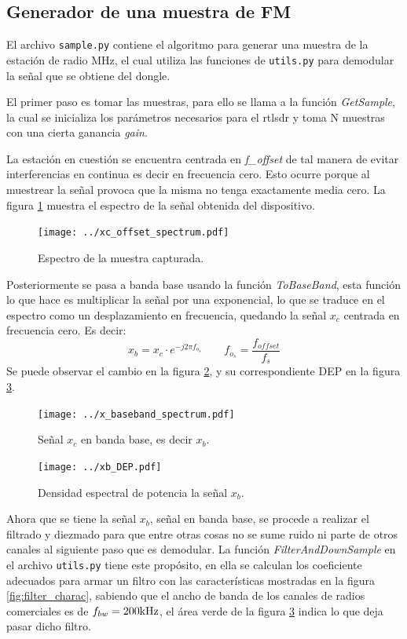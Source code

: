 \subsection{Generador de una muestra de FM}\label{sec:sample-generator}
El archivo \texttt{sample.py} contiene el algoritmo para generar una muestra de la estación de radio \sampleFM MHz, el cual utiliza las funciones de \texttt{utils.py} para demodular la señal que se obtiene del dongle.

El primer paso es tomar las muestras, para ello se llama a la función \emph{GetSample}, la cual se inicializa los parámetros necesarios para el rtlsdr y toma N muestras con una cierta ganancia \emph{gain}.

La estación en cuestión se encuentra centrada en \emph{f\_offset} de tal manera de evitar interferencias en continua es decir en frecuencia cero. Esto ocurre porque al muestrear la señal provoca que la misma no tenga exactamente media cero. 
La figura \ref{fig:xc_offset_spectrum} muestra el espectro de la señal obtenida del dispositivo.
\begin{figure}[ht!]
	\centering
	\texttt{[image: ../xc\_offset\_spectrum.pdf]}
	\caption{Espectro de la muestra capturada.}
	\label{fig:xc_offset_spectrum}
\end{figure}

Posteriormente se pasa a banda base usando la función \emph{ToBaseBand}, esta función lo que hace es multiplicar la señal por una exponencial, lo que se traduce en el espectro como un desplazamiento en frecuencia, quedando la señal $x_c$ centrada en frecuencia cero. Es decir:
$$
	x_b = x_c \cdot e^{-j 2 \pi f_{o_s}} \quad \quad f_{o_s} = \frac{f_{offset}}{f_s}
$$
Se puede observar el cambio en la figura \ref{fig:x_baseband_spectrum}, y su correspondiente DEP en la figura \ref{fig:x_baseband_DEP}.
\begin{figure}[ht!]
	\centering
	\texttt{[image: ../x\_baseband\_spectrum.pdf]}
	\caption{Señal $x_c$ en banda base, es decir $x_b$.}
	\label{fig:x_baseband_spectrum}
\end{figure}

\begin{figure}[ht!]
	\centering
	\texttt{[image: ../xb\_DEP.pdf]}
	\caption{Densidad espectral de potencia la señal $x_b$.}
	\label{fig:x_baseband_DEP} 
\end{figure}

Ahora que se tiene la señal $x_b$, señal en banda base, se procede a realizar el filtrado y diezmado para que entre otras cosas no se sume ruido ni parte de otros canales al siguiente paso que es demodular.
La función \emph{FilterAndDownSample} en el archivo \texttt{utils.py} tiene este propósito, en ella se calculan los coeficiente adecuados para armar un filtro con las características mostradas en la figura \ref{fig:filter_charac}, sabiendo que el ancho de banda de los canales de radios comerciales es de $f_{bw} = 200 \mbox{kHz}$, el área verde de la figura \ref{fig:x_baseband_DEP} indica lo que deja pasar dicho filtro.

